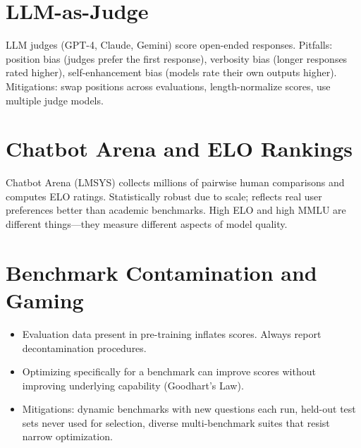 \section{LLM-as-Judge}

LLM judges (GPT-4, Claude, Gemini) score open-ended responses. Pitfalls: position bias (judges prefer the first response), verbosity bias (longer responses rated higher), self-enhancement bias (models rate their own outputs higher). Mitigations: swap positions across evaluations, length-normalize scores, use multiple judge models.

\section{Chatbot Arena and ELO Rankings}

Chatbot Arena (LMSYS) collects millions of pairwise human comparisons and computes ELO ratings. Statistically robust due to scale; reflects real user preferences better than academic benchmarks. High ELO and high MMLU are different things---they measure different aspects of model quality.

\section{Benchmark Contamination and Gaming}

\begin{itemize}
  \item Evaluation data present in pre-training inflates scores. Always report decontamination procedures.
  \item Optimizing specifically for a benchmark can improve scores without improving underlying capability (Goodhart's Law).
  \item Mitigations: dynamic benchmarks with new questions each run, held-out test sets never used for selection, diverse multi-benchmark suites that resist narrow optimization.
\end{itemize}
